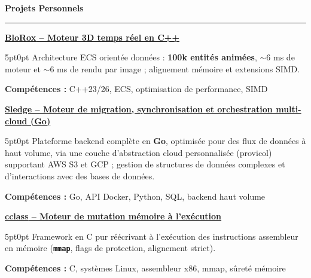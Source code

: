 \documentclass[9pt]{extarticle}
\begin{document}
\par\vspace{5pt}

{\large\bfseries Projets Personnels}
\par\vspace{-8pt}
\rule{\linewidth}{0.4pt}
\par\vspace{5pt}

\underline{\bfseries \href{https://github.com/paulogarithm/blorox}{BloRox} -- Moteur 3D temps réel en C++}
\par
\begin{adjustwidth}{5pt}{0pt}
	Architecture ECS orientée données : {\bfseries 100k entités animées}, $\sim$6 ms de moteur et $\sim$6 ms de rendu par image ; alignement mémoire et extensions SIMD.
\end{adjustwidth}
\par
{\bfseries Compétences :} C++23/26, ECS, optimisation de performance, SIMD

\par\vspace{8pt}

\underline{\bfseries Sledge -- Moteur de migration, synchronisation et orchestration multi-cloud (Go)}
\par
\begin{adjustwidth}{5pt}{0pt}
    Plateforme backend complète en {\bfseries Go}, optimisée pour des flux de données à haut volume, via une couche d'abstraction cloud personnalisée ({\ttfamily provicol}) supportant AWS S3 et GCP ; gestion de structures de données complexes et d'interactions avec des bases de données.
\end{adjustwidth}
\par
{\bfseries Compétences :} Go, API Docker, Python, SQL, backend haut volume

\par\vspace{8pt}

\underline{\bfseries \href{https://github.com/paulogarithm/cclass}{cclass} -- Moteur de mutation mémoire à l'exécution}
\par
\begin{adjustwidth}{5pt}{0pt}
    Framework en C pur réécrivant à l'exécution des instructions assembleur en mémoire ({\bfseries \texttt{mmap}}, flags de protection, alignement strict).
\end{adjustwidth}
\par
{\bfseries Compétences :} C, systèmes Linux, assembleur x86, mmap, sûreté mémoire
\end{document}
